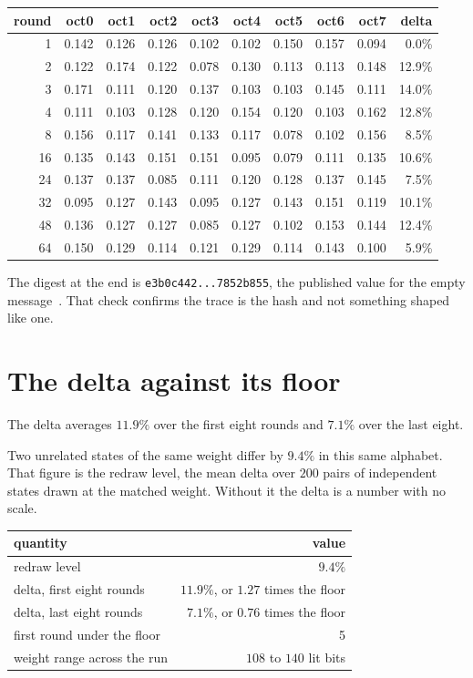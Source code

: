 \begin{center}
\begin{tabular}{@{}rrrrrrrrrr@{}}
\toprule
round & oct0 & oct1 & oct2 & oct3 & oct4 & oct5 & oct6 & oct7 & delta \\
\midrule
1 & 0.142 & 0.126 & 0.126 & 0.102 & 0.102 & 0.150 & 0.157 & 0.094 & 0.0\% \\
2 & 0.122 & 0.174 & 0.122 & 0.078 & 0.130 & 0.113 & 0.113 & 0.148 & 12.9\% \\
3 & 0.171 & 0.111 & 0.120 & 0.137 & 0.103 & 0.103 & 0.145 & 0.111 & 14.0\% \\
4 & 0.111 & 0.103 & 0.128 & 0.120 & 0.154 & 0.120 & 0.103 & 0.162 & 12.8\% \\
8 & 0.156 & 0.117 & 0.141 & 0.133 & 0.117 & 0.078 & 0.102 & 0.156 & 8.5\% \\
16 & 0.135 & 0.143 & 0.151 & 0.151 & 0.095 & 0.079 & 0.111 & 0.135 & 10.6\% \\
24 & 0.137 & 0.137 & 0.085 & 0.111 & 0.120 & 0.128 & 0.137 & 0.145 & 7.5\% \\
32 & 0.095 & 0.127 & 0.143 & 0.095 & 0.127 & 0.143 & 0.151 & 0.119 & 10.1\% \\
48 & 0.136 & 0.127 & 0.127 & 0.085 & 0.127 & 0.102 & 0.153 & 0.144 & 12.4\% \\
64 & 0.150 & 0.129 & 0.114 & 0.121 & 0.129 & 0.114 & 0.143 & 0.100 & 5.9\% \\
\bottomrule
\end{tabular}
\end{center}

The digest at the end is \texttt{e3b0c442...7852b855}, the published value for the empty message~\cite{src:FIPS-180-4}. That check confirms the trace is the hash and not something shaped like one.

\section{The delta against its floor}

The delta averages \(11.9\%\) over the first eight rounds and \(7.1\%\) over the last eight.

Two unrelated states of the same weight differ by \(9.4\%\) in this same alphabet. That figure is the redraw level, the mean delta over \(200\) pairs of independent states drawn at the matched weight. Without it the delta is a number with no scale.

\begin{center}
\begin{tabular}{@{}lr@{}}
\toprule
quantity & value \\
\midrule
redraw level & \(9.4\%\) \\
delta, first eight rounds & \(11.9\%\), or \(1.27\) times the floor \\
delta, last eight rounds & \(7.1\%\), or \(0.76\) times the floor \\
first round under the floor & 5 \\
weight range across the run & \(108\) to \(140\) lit bits \\
\bottomrule
\end{tabular}
\end{center}

